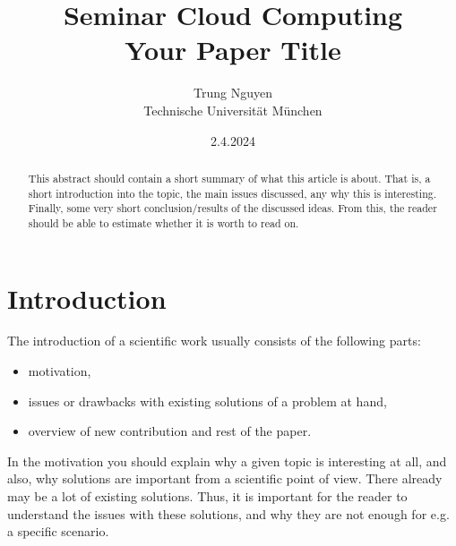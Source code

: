 \documentclass[A4,twocolumn]{article}
\author{Trung Nguyen\\ Technische Universit\"at M\"unchen}
\title{Seminar Cloud Computing \\
       {\bf Your Paper Title}
}
\date{2.4.2024}
\begin{document}
\maketitle

\begin{abstract}

This abstract should contain a short summary of what this
article is about. That is, a short introduction into the
topic, the main issues discussed, any why this is interesting.
Finally, some very short conclusion/results of the discussed
ideas. From this, the reader should be able to estimate whether
it is worth to read on.
\end{abstract}

\section{Introduction}

\label{introduction}

The introduction of a scientific work usually consists of the following
parts:

\begin{itemize}
	\item motivation,
	\item issues or drawbacks with existing solutions of a problem at 
hand,
	\item overview of new contribution and rest of the paper.
\end{itemize}

In the motivation you should explain why a given topic is interesting
at all, and also, why solutions are important from a scientific point
of view. There already may be a lot of existing solutions. Thus, it
is important for the reader to understand the issues with these solutions,
and why they are not enough for e.g. a specific scenario.
\end{document}
